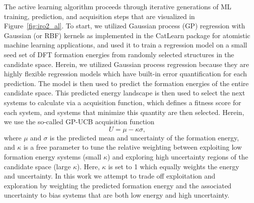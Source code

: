 %
%
The active learning algorithm proceeds through iterative generations of ML training, prediction, and acquisition steps that are visualized in Figure~\ref{fig:iro2_al}.
%
To start, we utilized Gaussian process (GP) regression with Gaussian (or RBF) kernels as implemented in the CatLearn\cite{hansen2019atomistic,CatLearn_Repo} package for atomistic machine learning applications, and used it to train a regression model on a small seed set of DFT formation energies from randomly selected structures in the candidate space.
%
Herein, we utilized Gaussian process regression because they are highly flexible regression models which have built-in error quantification for each prediction.
%
The model is then used to predict the formation energies of the entire candidate space.
%
This predicted energy landscape is then used to select the next systems to calculate via a acquisition function, which defines a fitness score for each system, and systems that minimize this quantity are then selected.
%
Herein, we use the so-called GP-UCB acquisition function
%
\begin{equation}
    U = \mu - \kappa \sigma,
\end{equation}
%
where $\mu$ and $\sigma$ is the predicted mean and uncertainty of the formation energy,
and $\kappa$ is a free parameter to tune the relative weighting between exploiting low formation energy systems (small $\kappa$) and exploring high uncertainty regions of the candidate space (large $\kappa$).
%
Here, $\kappa$ is set to \num{1} which equally weights the energy and uncertainty.
%
In this work we attempt to trade off exploitation and exploration by weighting the predicted formation energy and the associated uncertainty to bias systems that are both low energy and high uncertainty.
